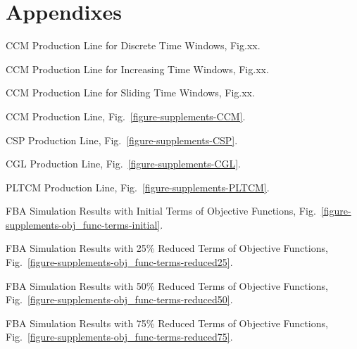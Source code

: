 \chapter{Appendixes}
\captionsetup{list=no}
\begin{itemize}
	{\color{red}
	\item CCM Production Line for Discrete Time Windows, Fig.xx.
	\item CCM Production Line for Increasing Time Windows, Fig.xx.
	\item CCM Production Line for Sliding Time Windows, Fig.xx.}
	\item CCM Production Line, Fig.~\ref{figure-supplements-CCM}.
	\item CSP Production Line, Fig.~\ref{figure-supplements-CSP}.
	\item CGL Production Line, Fig.~\ref{figure-supplements-CGL}.
	\item PLTCM Production Line, Fig.~\ref{figure-supplements-PLTCM}.
	
	\item FBA Simulation Results with Initial Terms of Objective Functions, Fig.~\ref{figure-supplements-obj_func-terms-initial}.
	\item FBA Simulation Results with 25\% Reduced Terms of Objective Functions, Fig.~\ref{figure-supplements-obj_func-terms-reduced25}.
	\item FBA Simulation Results with 50\% Reduced Terms of Objective Functions, Fig.~\ref{figure-supplements-obj_func-terms-reduced50}.
	\item FBA Simulation Results with 75\% Reduced Terms of Objective Functions, Fig.~\ref{figure-supplements-obj_func-terms-reduced75}.
\end{itemize}
\clearpage

\beginsupplement










